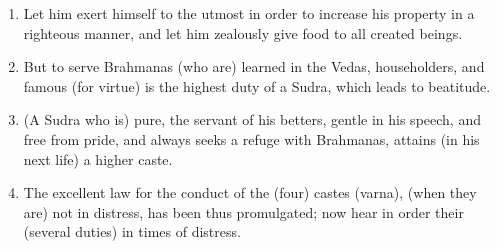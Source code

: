 \begin{enumerate}
\item Let him exert himself to the utmost in order to increase his property in a righteous manner, and let him zealously give food to all created beings.
\item But to serve Brahmanas (who are) learned in the Vedas, householders, and famous (for virtue) is the highest duty of a Sudra, which leads to beatitude.
\item (A Sudra who is) pure, the servant of his betters, gentle in his speech, and free from pride, and always seeks a refuge with Brahmanas, attains (in his next life) a higher caste.
\item The excellent law for the conduct of the (four) castes (varna), (when they are) not in distress, has been thus promulgated; now hear in order their (several duties) in times of distress.
\end{enumerate}

